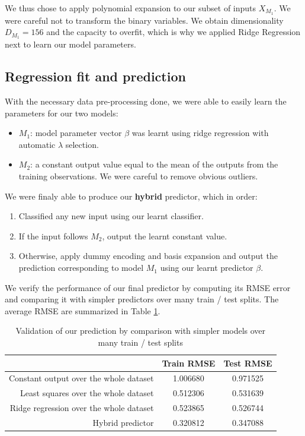 \documentclass{article} %
\begin{document}
  We thus chose to apply polynomial expansion to our subset of inputs $X_{M_1}$. We were careful not to transform the binary variables. We obtain dimensionality $D_{M_1} = 156$ and the capacity to overfit, which is why we applied Ridge Regression next to learn our model parameters.

  \subsection{Regression fit and prediction}
  With the necessary data pre-processing done, we were able to easily learn the parameters for our two models:
  \begin{itemize}
    \item $M_1$: model parameter vector $\beta$ was learnt using ridge regression with automatic $\lambda$ selection.
    \item $M_2$: a constant output value equal to the mean of the outputs from the training observations. We were careful to remove obvious outliers.
  \end{itemize}

  We were finaly able to produce our \textbf{hybrid} predictor, which in order:
  \begin{enumerate}
    \item Classified any new input using our learnt classifier.
    \item If the input follows $M_2$, output the learnt constant value.
    \item Otherwise, apply dummy encoding and basis expansion and output the prediction corresponding to model $M_1$ using our learnt predictor $\beta$.
  \end{enumerate}

  We verify the performance of our final predictor by computing its RMSE error and comparing it with simpler predictors over many train / test splits. The average RMSE are summarized in Table \ref{predictorValidation}.

  \begin{table}[h]
    \center
    \begin{tabular}{|r|c|c|}
      \hline
                                              & Train RMSE & Test RMSE \\
      \hline
      Constant output over the whole dataset  & 1.006680   & 0.971525 \\
      \hline
      Least squares over the whole dataset    & 0.512306   & 0.531639 \\
      \hline
      Ridge regression over the whole dataset & 0.523865   & 0.526744 \\
      \hline
      Hybrid predictor                        & 0.320812   & 0.347088 \\
      \hline
    \end{tabular}
    \caption{Validation of our prediction by comparison with simpler models over many train / test splits}
    \label{predictorValidation}
  \end{table}
\end{document}
